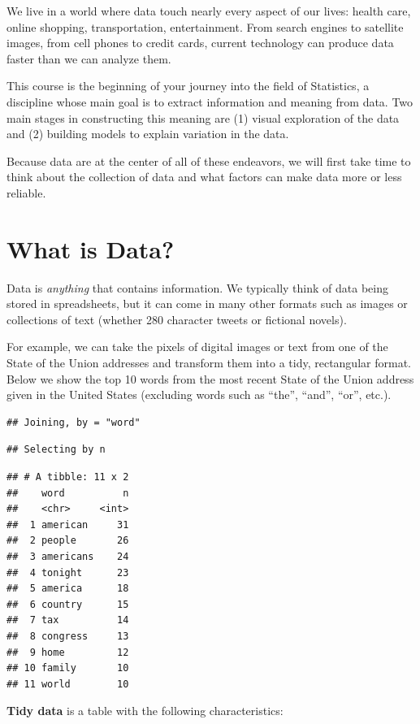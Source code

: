 \documentclass[]{book}
\begin{document}
We live in a world where data touch nearly every aspect of our lives: health care, online shopping, transportation, entertainment. From search engines to satellite images, from cell phones to credit cards, current technology can produce data faster than we can analyze them.

This course is the beginning of your journey into the field of Statistics, a discipline whose main goal is to extract information and meaning from data. Two main stages in constructing this meaning are (1) visual exploration of the data and (2) building models to explain variation in the data.

Because data are at the center of all of these endeavors, we will first take time to think about the collection of data and what factors can make data more or less reliable.

\hypertarget{what-is-data}{%
\section{What is Data?}\label{what-is-data}}

Data is \emph{anything} that contains information. We typically think of data being stored in spreadsheets, but it can come in many other formats such as images or collections of text (whether 280 character tweets or fictional novels).

For example, we can take the pixels of digital images or text from one of the State of the Union addresses and transform them into a tidy, rectangular format. Below we show the top 10 words from the most recent State of the Union address given in the United States (excluding words such as ``the'', ``and'', ``or'', etc.).

\begin{verbatim}
## Joining, by = "word"
\end{verbatim}

\begin{verbatim}
## Selecting by n
\end{verbatim}

\begin{verbatim}
## # A tibble: 11 x 2
##    word          n
##    <chr>     <int>
##  1 american     31
##  2 people       26
##  3 americans    24
##  4 tonight      23
##  5 america      18
##  6 country      15
##  7 tax          14
##  8 congress     13
##  9 home         12
## 10 family       10
## 11 world        10
\end{verbatim}

\textbf{Tidy data} is a table with the following characteristics:
\end{document}
